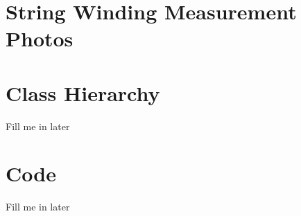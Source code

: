\documentclass[../main.tex]{subfiles}
\begin{document}
\appendix

\chapter{String Winding Measurement Photos}

\chapter{Class Hierarchy}
Fill me in later

\chapter{Code}
Fill me in later
\end{document}
